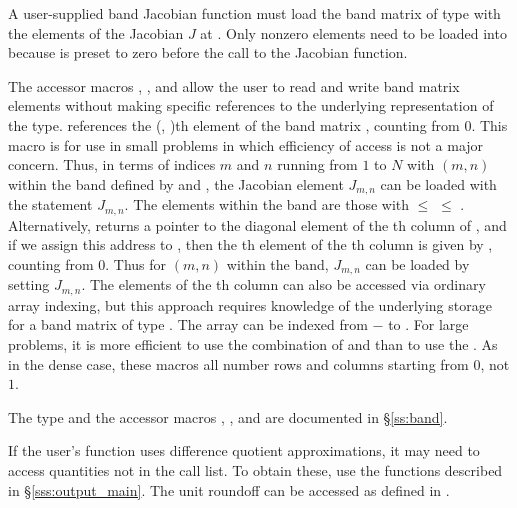 {
  A user-supplied band Jacobian function must load the band matrix 
  of type  with the elements of the Jacobian $J$ at .
  Only nonzero elements need to be loaded into
   because  is preset to zero before the call to the
  Jacobian function.  

  The accessor macros , , and  
  allow the user to read and write band matrix elements without making specific 
  references to the underlying representation of the  type.
   references the (, )th element of the 
  band matrix , counting from $0$.
  This macro is for use in small problems in which efficiency of access is not
  a major concern.  Thus, in terms of indices $m$ and $n$ running from $1$ to
  $N$ with $(m,n)$ within the band defined by  and
  , the Jacobian element $J_{m,n}$ can be loaded with the 
  statement  $J_{m,n}$. The elements within
  the band are those with  $\le$  $\le$ .
  Alternatively,  returns a pointer to the diagonal element
  of the th column of , and if we assign this address to 
  , then the th element of the th column is
  given by , counting from $0$.
  Thus for $(m,n)$ within the band, $J_{m,n}$ can be loaded by setting 
   
  $J_{m,n}$.  The elements of the th column can also be accessed
  via ordinary array indexing, but this approach requires knowledge of
  the underlying storage for a band matrix of type .  
  The array  can be indexed from $-$ to .
  For large problems, it is more efficient to use the combination of
   and  than to use the
  .  As in the dense case, these macros all number rows
  and columns starting from $0$, not $1$.  

  The  type and the accessor macros , ,
  and  are documented in \S\ref{ss:band}.

  If the user's  function uses difference quotient approximations,
  it may need to access quantities not in the call list. To obtain these, use the
   functions described in \S\ref{sss:output_main}. The unit roundoff
  can be accessed as  defined in .
}

